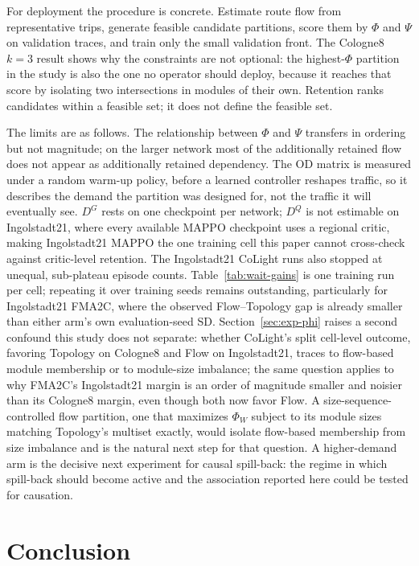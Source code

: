 \documentclass[journal]{IEEEtran}
\theoremstyle{definition}
\begin{document}
For deployment the procedure is concrete.
Estimate route flow from representative trips, generate feasible candidate partitions, score them by $\Phi$ and $\Psi$ on validation traces, and train only the small validation front.
The Cologne8 $k=3$ result shows why the constraints are not optional: the highest-$\Phi$ partition in the study is also the one no operator should deploy, because it reaches that score by isolating two intersections in modules of their own.
Retention ranks candidates within a feasible set; it does not define the feasible set.

The limits are as follows.
The relationship between $\Phi$ and $\Psi$ transfers in ordering but not magnitude; on the larger network most of the additionally retained flow does not appear as additionally retained dependency.
The OD matrix is measured under a random warm-up policy, before a learned controller reshapes traffic, so it describes the demand the partition was designed for, not the traffic it will eventually see. $D^G$ rests on one checkpoint per network; $D^Q$ is not estimable on Ingolstadt21, where every available MAPPO checkpoint uses a regional critic, making Ingolstadt21 MAPPO the one training cell this paper cannot cross-check against critic-level retention.
The Ingolstadt21 CoLight runs also stopped at unequal, sub-plateau episode counts.
Table~\ref{tab:wait-gains} is one training run per cell; repeating it over training seeds remains outstanding, particularly for Ingolstadt21 FMA2C, where the observed Flow--Topology gap is already smaller than either arm's own evaluation-seed SD.
Section~\ref{sec:exp-phi} raises a second confound this study does not separate: whether CoLight's split cell-level outcome, favoring Topology on Cologne8 and Flow on Ingolstadt21, traces to flow-based module membership or to module-size imbalance; the same question applies to why FMA2C's Ingolstadt21 margin is an order of magnitude smaller and noisier than its Cologne8 margin, even though both now favor Flow.
A size-sequence-controlled flow partition, one that maximizes $\Phi_W$ subject to its module sizes matching Topology's multiset exactly, would isolate flow-based membership from size imbalance and is the natural next step for that question.
A higher-demand arm is the decisive next experiment for causal spill-back: the regime in which spill-back should become active and the association reported here could be tested for causation.

\section{Conclusion}
\label{sec:conclusion}
\end{document}
